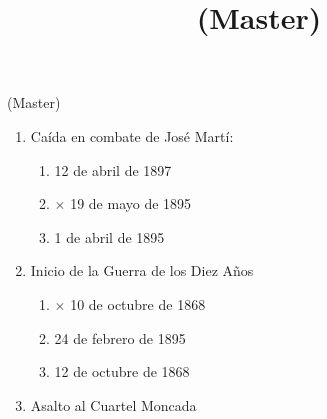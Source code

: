 \documentclass[twocolumn]{article}
\title{  (Master) }
\date{}
\begin{document}

\begin{center}
 \Large{  (Master) }
\end{center}



\begin{enumerate}



  \item Caída en combate de José Martí:

  \begin{enumerate}
   
   \item  12 de abril de 1897
   
   \item $\times$ 19 de mayo de 1895
   
   \item  1 de abril de 1895
   
  \end{enumerate}



  \item Inicio de la Guerra de los Diez Años

  \begin{enumerate}
   
   \item $\times$ 10 de octubre de 1868
   
   \item  24 de febrero de 1895
   
   \item  12 de octubre de 1868
   
  \end{enumerate}



  \item Asalto al Cuartel Moncada

  \begin{enumerate}
   

\end{enumerate}
\end{enumerate}
\end{document}
